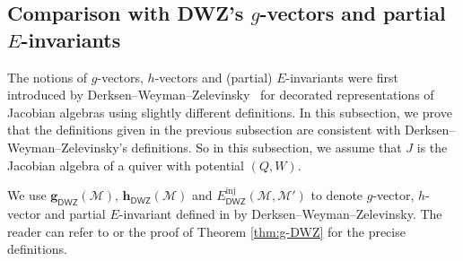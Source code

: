 \documentclass[12pt]{amsart}
\theoremstyle{definition}
\theoremstyle{remark}
\numberwithin{equation}{section}
\newcommand{\DWZ}{\mathsf{DWZ}}
\begin{document}
\subsection{Comparison with DWZ's $g$-vectors and partial $E$-invariants}
The notions of $g$-vectors, $h$-vectors and (partial) $E$-invariants were first introduced by Derksen--Weyman--Zelevinsky~\cite{DWZ10}
for decorated representations of Jacobian algebras using slightly different definitions. In this subsection, we prove that the definitions given in the previous subsection are consistent with Derksen--Weyman--Zelevinsky's definitions. So in this subsection, we assume that $J$ is the Jacobian algebra of a quiver with potential $(Q,W)$.

We use $\mathbf{g}_\DWZ(\mathcal{M})$,  $\mathbf{h}_{\DWZ}(\mathcal{M})$  and $E^{\mathrm{inj}}_\DWZ(\mathcal{M}, \mathcal{M}')$ to denote $g$-vector, $h$-vector and partial $E$-invariant defined in \cite{DWZ10} by Derksen--Weyman--Zelevinsky. The reader can refer to \cite{DWZ10} or the proof of Theorem \ref{thm:g-DWZ} for the precise definitions.
\end{document}
